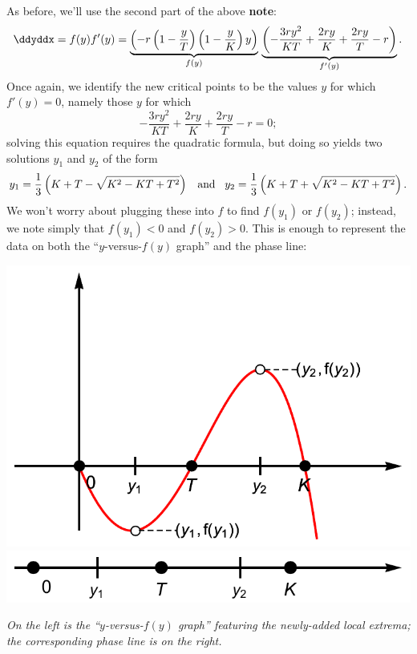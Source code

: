 \documentclass[12pt]{article}
\theoremstyle{definition}
\theoremstyle{underl}
\newcommand{\capt}[1]{\begin{adjustwidth}{0.5in}{0.5in}\centering\small\textit{#1}\end{adjustwidth}}
\begin{document}
	As before, we'll use the second part of the above  \textbf{note}:
	\begin{equation}
	\label{eq:CritPt2}
	\ddyddx=f(y)f'(y)=\underbrace{\left(-r\left(1-\frac{y}{T}\right)\left(1-\frac{y}{K}\right) y\right)}_{f(y)}\,\underbrace{\left(-\frac{3 r y^2}{K T}+\frac{2 r y}{K}+\frac{2 r y}{T}-r\right)}_{f'(y)}.
	\end{equation}
	Once again, we identify the new critical points to be the values $y$ for which $f'(y)=0$, namely those $y$ for which
	\begin{equation}
		\label{eq:Ex2Quad}
		-\frac{3 r y^2}{K T}+\frac{2 r y}{K}+\frac{2 r y}{T}-r=0;
	\end{equation}
	solving this equation requires the quadratic formula, but doing so yields two solutions $y_1$ and $y_2$ of the form
	$$y_1=\frac{1}{3} \left(K+T-\sqrt{K^2-K T+T^2}\right)\hspace{3mm}\text{and}\hspace{3mm}y_2=\frac{1}{3} \left(K+T+\sqrt{K^2-K T+T^2}\right).$$
	We won't worry about plugging these into $f$ to find $f(y_1)$ or $f(y_2)$; instead, we note simply that $f(y_1)<0$ and $f(y_2)>0$. This is enough to represent the data on both the ``$y$-versus-$f(y)$ graph'' and the phase line:
	\begin{center}
		\includegraphics[align=c,scale=0.675]{Ex2_yf(y)_2}
		\hspace{9mm}
		\includegraphics[align=c,scale=0.675]{Ex2_Phase_2}
		\vspace{1.5mm}
		\capt{On the left is the ``$y$-versus-$f(y)$ graph'' featuring the newly-added local extrema; the corresponding phase line is on the right.}
	\end{center}
\end{document}
